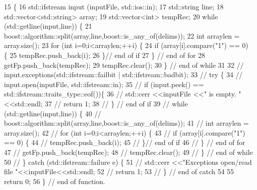 \begin{DoxyCode}
15                                           \{
16     std::ifstream input (inputFile, std::ios::in);
17     std::string line;
18     std::vector<std::string> array;
19     std::vector<int> tempRec;
20     \textcolor{keywordflow}{while} (std::getline(input,line)) \{
21       boost::algorithm::split(array,line,boost::is\_any\_of(delims));
22       \textcolor{keywordtype}{int} arraylen = array.size();
23       \textcolor{keywordflow}{for} (\textcolor{keywordtype}{int} i=0;i<arraylen;++i) \{
24         \textcolor{keywordflow}{if} (array[i].compare(\textcolor{stringliteral}{"1"}) == 0) \{
25           tempRec.push\_back(i);
26         \}\textcolor{comment}{// end of if}
27       \} \textcolor{comment}{// end of for}
28       getFp.push\_back(tempRec);
29       tempRec.clear();
30     \} \textcolor{comment}{// end of while}
31 
32     \textcolor{comment}{// input.exceptions(std::ifstream::failbit | std::ifstream::badbit);}
33     \textcolor{comment}{// try \{}
34     \textcolor{comment}{//   input.open(inputFile, std::ifstream::in);}
35     \textcolor{comment}{//   if (input.peek() == std::ifstream::traits\_type::eof())\{}
36     \textcolor{comment}{//     std::cerr <<inputFile <<" is empty. " <<std::endl;}
37     \textcolor{comment}{//     return 1;}
38     \textcolor{comment}{//   \} // end of if}
39     \textcolor{comment}{//   while (std::getline(input,line)) \{}
40     \textcolor{comment}{//     boost::algorithm::split(array,line,boost::is\_any\_of(delims));}
41     \textcolor{comment}{//     int arraylen = array.size();}
42     \textcolor{comment}{//     for (int i=0;i<arraylen;++i) \{}
43     \textcolor{comment}{//       if (array[i].compare("1") == 0) \{}
44     \textcolor{comment}{//         tempRec.push\_back(i);}
45     \textcolor{comment}{//       \}// end of if}
46     \textcolor{comment}{//     \} // end of for}
47     \textcolor{comment}{//     getFp.push\_back(tempRec);}
48     \textcolor{comment}{//     tempRec.clear();}
49     \textcolor{comment}{//   \} // end of while}
50     \textcolor{comment}{// \} catch (std::ifstream::failure e) \{}
51     \textcolor{comment}{//   std::cerr <<"Exceptions open/read file "<<inputFile<<std::endl;}
52     \textcolor{comment}{//   return 1;}
53     \textcolor{comment}{// \} // end of catch}
54 
55     \textcolor{keywordflow}{return} 0;
56   \} \textcolor{comment}{// end of function.}
\end{DoxyCode}
